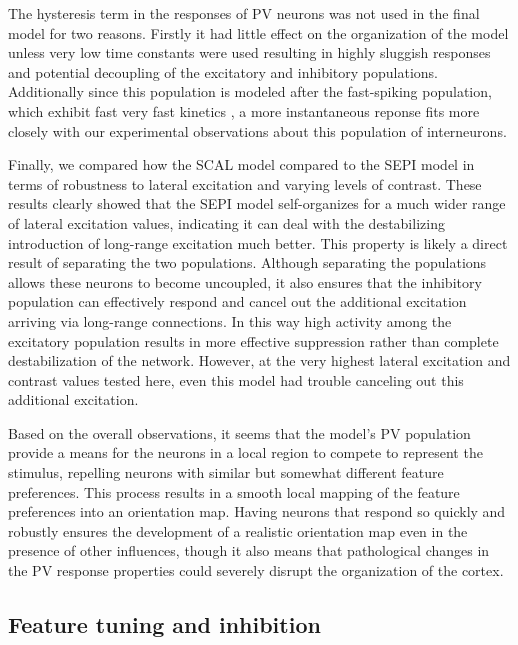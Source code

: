 The hysteresis term in the responses of PV neurons was not used in the
final model for two reasons. Firstly it had little effect on the
organization of the model unless very low time constants were used
resulting in highly sluggish responses and potential decoupling of the
excitatory and inhibitory populations. Additionally since this
population is modeled after the fast-spiking population, which exhibit
fast very fast kinetics \citep{Cruikshank2007,Gabernet2005}, a more
instantaneous reponse fits more closely with our experimental
observations about this population of interneurons.

Finally, we compared how the SCAL model compared to the SEPI model in
terms of robustness to lateral excitation and varying levels of
contrast. These results clearly showed that the SEPI model
self-organizes for a much wider range of lateral excitation values,
indicating it can deal with the destabilizing introduction of
long-range excitation much better. This property is likely a direct
result of separating the two populations. Although separating the
populations allows these neurons to become uncoupled, it also ensures
that the inhibitory population can effectively respond and cancel out
the additional excitation arriving via long-range connections. In this
way high activity among the excitatory population results in more
effective suppression rather than complete destabilization of the
network. However, at the very highest lateral excitation and contrast
values tested here, even this model had trouble canceling out this
additional excitation.

Based on the overall observations, it seems that the model's PV
population provide a means for the neurons in a local region to
compete to represent the stimulus, repelling neurons with similar but
somewhat different feature preferences.  This process results in a
smooth local mapping of the feature preferences into an orientation
map. Having neurons that respond so quickly and robustly ensures the
development of a realistic orientation map even in the presence of
other influences, though it also means that pathological changes in
the PV response properties could severely disrupt the organization of
the cortex.

\subsection{Feature tuning and inhibition}

